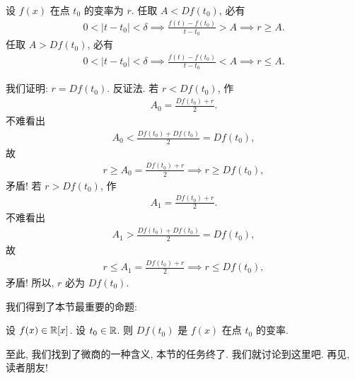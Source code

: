 设 $f(x)$ 在点 $t_0$ 的变率为 $r$. 任取 $A < Df(t_0)$, 必有
\begin{align*}
    0 < |t - t_0| < \delta \implies \frac{f(t) - f(t_0)}{t - t_0} > A \implies r \geq A.
\end{align*}
任取 $A > Df(t_0)$, 必有
\begin{align*}
    0 < |t - t_0| < \delta \implies \frac{f(t) - f(t_0)}{t - t_0} < A \implies r \leq A.
\end{align*}

我们证明: $r = Df(t_0)$. 反证法. 若 $r < Df(t_0)$, 作
\begin{align*}
    A_0 = \frac{Df(t_0) + r}{2}.
\end{align*}
不难看出
\begin{align*}
    A_0 < \frac{Df(t_0) + Df(t_0)}{2} = Df(t_0),
\end{align*}
故
\begin{align*}
    r \geq A_0 = \frac{Df(t_0) + r}{2} \implies r \geq Df(t_0),
\end{align*}
矛盾! 若 $r > Df(t_0)$, 作
\begin{align*}
    A_1 = \frac{Df(t_0) + r}{2}.
\end{align*}
不难看出
\begin{align*}
    A_1 > \frac{Df(t_0) + Df(t_0)}{2} = Df(t_0),
\end{align*}
故
\begin{align*}
    r \leq A_1 = \frac{Df(t_0) + r}{2} \implies r \leq Df(t_0),
\end{align*}
矛盾! 所以, $r$ 必为 $Df(t_0)$.

我们得到了本节最重要的命题:

\begin{proposition}
    设 $f (x) \in \mathbb{R}[x]$. 设 $t_0 \in \mathbb{R}$. 则 $Df(t_0)$ 是 $f(x)$ 在点 $t_0$ 的变率.
\end{proposition}

至此, 我们找到了微商的一种含义, 本节的任务终了. 我们就讨论到这里吧. 再见, 读者朋友!

